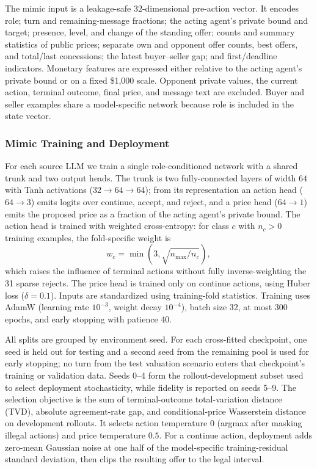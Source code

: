 \documentclass[conference]{IEEEtran}
\begin{document}
The mimic input is a leakage-safe 32-dimensional pre-action vector. It encodes role; turn and remaining-message fractions; the acting agent's private bound and target; presence, level, and change of the standing offer; counts and summary statistics of public prices; separate own and opponent offer counts, best offers, and total/last concessions; the latest buyer--seller gap; and first/deadline indicators. Monetary features are expressed either relative to the acting agent's private bound or on a fixed \$1{,}000 scale. Opponent private values, the current action, terminal outcome, final price, and message text are excluded. Buyer and seller examples share a model-specific network because role is included in the state vector.

\subsubsection{Mimic Training and Deployment}

For each source LLM we train a single role-conditioned network with a shared trunk and two output heads. The trunk is two fully-connected layers of width $64$ with Tanh activations ($32\!\to\!64\!\to\!64$); from its representation an action head ($64\!\to\!3$) emits logits over continue, accept, and reject, and a price head ($64\!\to\!1$) emits the proposed price as a fraction of the acting agent's private bound. The action head is trained with weighted cross-entropy: for class $c$ with $n_c>0$ training examples, the fold-specific weight is
\begin{equation}
w_c=\min\!\left(3,\sqrt{n_{\max}/n_c}\right),
\end{equation}
which raises the influence of terminal actions without fully inverse-weighting the 31 sparse rejects. The price head is trained only on continue actions, using Huber loss ($\delta=0.1$). Inputs are standardized using training-fold statistics. Training uses AdamW (learning rate $10^{-3}$, weight decay $10^{-4}$), batch size 32, at most 300 epochs, and early stopping with patience 40.

All splits are grouped by environment seed. For each cross-fitted checkpoint, one seed is held out for testing and a second seed from the remaining pool is used for early stopping; no turn from the test valuation scenario enters that checkpoint's training or validation data. Seeds 0--4 form the rollout-development subset used to select deployment stochasticity, while fidelity is reported on seeds 5--9. The selection objective is the sum of terminal-outcome total-variation distance (TVD), absolute agreement-rate gap, and conditional-price Wasserstein distance on development rollouts. It selects action temperature $0$ (argmax after masking illegal actions) and price temperature $0.5$. For a continue action, deployment adds zero-mean Gaussian noise at one half of the model-specific training-residual standard deviation, then clips the resulting offer to the legal interval.
\end{document}
